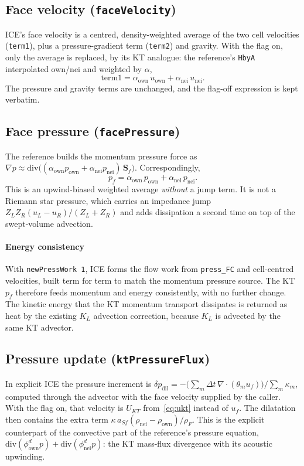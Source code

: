 \documentclass[11pt]{article}
\newcommand{\code}[1]{\texttt{\small #1}}
\newcommand{\own}{\mathrm{own}}
\newcommand{\nei}{\mathrm{nei}}
\newcommand{\dt}{\Delta t}
\begin{document}
\subsection{Face velocity (\code{faceVelocity})}
ICE's face velocity is a centred, density-weighted average of the two cell velocities
(\code{term1}), plus a pressure-gradient term (\code{term2}) and gravity. With the flag on,
only the average is replaced, by its KT analogue: the reference's \code{HbyA} interpolated
own/nei and weighted by $\alpha$,
\begin{equation}
  \text{term1} = \alpha_\own\,u_\own + \alpha_\nei\,u_\nei .
\end{equation}
The pressure and gravity terms are unchanged, and the flag-off expression is kept
verbatim.

\subsection{Face pressure (\code{facePressure})}
The reference builds the momentum pressure force as
$\nabla p \approx \mathrm{div}\bigl((\alpha_\own p_\own+\alpha_\nei p_\nei)\,\mathbf S_f\bigr)$.
Correspondingly,
\begin{equation}
  p_f = \alpha_\own\,p_\own + \alpha_\nei\,p_\nei .
\end{equation}
This is an upwind-biased weighted average \emph{without} a jump term. It is not a Riemann
star pressure, which carries an impedance jump $Z_LZ_R(u_L-u_R)/(Z_L+Z_R)$ and adds
dissipation a second time on top of the swept-volume advection.

\paragraph{Energy consistency}
With \code{newPressWork 1}, ICE forms the flow work from \code{press\_FC} and cell-centred
velocities, built term for term to match the momentum pressure source. The KT $p_f$ therefore
feeds momentum and energy consistently, with no further change. The kinetic energy that the
KT momentum transport dissipates is returned as heat by the existing $K_L$ advection
correction, because $K_L$ is advected by the same KT advector.

\subsection{Pressure update (\code{ktPressureFlux})}
In explicit ICE the pressure increment is
$\delta p_{\mathrm{dil}} = -\bigl(\sum_m \dt\,\nabla\!\cdot(\theta_m u_f)\bigr)/\sum_m\kappa_m$,
computed through the advector with the face velocity supplied by the caller. With the flag
on, that velocity is $U_{KT}$ from~\eqref{eq:ukt} instead of $u_f$. The dilatation then
contains the extra term $\kappa\,a_{Sf}(\rho_\nei-\rho_\own)/\rho_F$. This is the explicit
counterpart of the convective part of the reference's pressure equation,
$\mathrm{div}(\phi^d_\own p)+\mathrm{div}(\phi^d_\nei p)$: the KT mass-flux divergence
with its acoustic upwinding.
\end{document}
